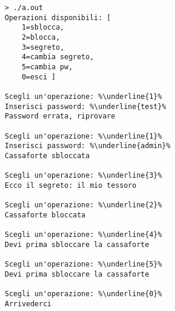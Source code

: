 \documentclass[addpoints,12pt,answers]{exam}
\begin{document}
\begin{lstlisting}[style=verbatim]
> ./a.out
Operazioni disponibili: [
    1=sblocca, 
    2=blocca,
    3=segreto,
    4=cambia segreto,
    5=cambia pw,
    0=esci ]

Scegli un'operazione: %\underline{1}%
Inserisci password: %\underline{test}%
Password errata, riprovare

Scegli un'operazione: %\underline{1}% 
Inserisci password: %\underline{admin}%
Cassaforte sbloccata

Scegli un'operazione: %\underline{3}%
Ecco il segreto: il mio tessoro

Scegli un'operazione: %\underline{2}%
Cassaforte bloccata

Scegli un'operazione: %\underline{4}%
Devi prima sbloccare la cassaforte

Scegli un'operazione: %\underline{5}%
Devi prima sbloccare la cassaforte

Scegli un'operazione: %\underline{0}%
Arrivederci
\end{lstlisting}
\end{document}
